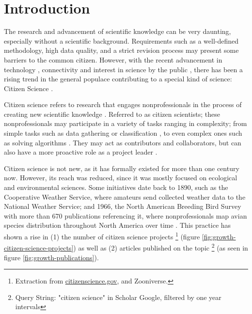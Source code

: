 \chapter*[Introduction]{Introduction}

The research and advancement of scientific knowledge can be very daunting, especially without a scientific background. Requirements such as a well-defined methodology, high data quality, and a strict revision process may present some barriers to the common citizen. However, with the recent advancement in technology \cite{newman2012future}, connectivity \cite{newman2012future} and interest in science by the public \cite{silvertown2009new}, there has been a rising trend in the general populace contributing to a special kind of science: Citizen Science \cite{mckinley2017citizen}.

Citizen science refers to research that engages nonprofessionals in the process of creating new scientific knowledge \cite{bonney2014next}. Referred to as citizen scientists; these nonprofessionals may participate in a variety of tasks ranging in complexity; from simple tasks such as data gathering or classification \cite{barker2013pascal}, to even complex ones such as solving algorithms \cite{cooper2010predicting}. They may act as contributors and collaborators, but can also have a more proactive role as a project leader \cite{robinson2018ten}.

Citizen science is not new, as it has formally existed for more than one century now. However, its reach was reduced, since it was mostly focused on ecological and environmental sciences. Some initiatives date back to 1890, such as the Cooperative Weather Service, where amateurs send collected weather data to the National Weather Service; and 1966, the North American Breeding Bird Survey with more than 670 publications referencing it, where nonprofessionals map avian species distribution throughout North America over time \cite{kosmala2016assessing}. This practice has shown a rise in (1) the number of citizen science projects \footnote{Extraction from \href{citizenscience.gov}{citizenscience.gov}, and Zooniverse.} (figure \ref{fig:growth-citizen-science-projects}) as well as (2) articles published on the topic \footnote{Query String: "citizen science" in Scholar Google, filtered by one year intervals} (as seen in figure \ref{fig:growth-publications}).

\publicationdata

